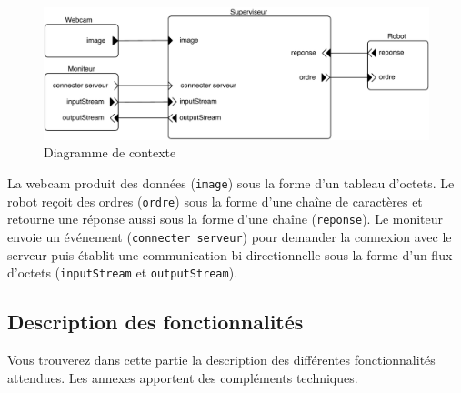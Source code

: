  \begin{figure}[htbp]
\begin{center}
\includegraphics[scale=0.6]{figures_pdf/contexte}
\caption{Diagramme de contexte}
\label{fig:contexte}
\end{center}
\end{figure}
\FloatBarrier

La webcam produit des données (\texttt{image}) sous la forme d'un tableau d'octets. Le robot reçoit des ordres (\texttt{ordre}) sous la forme d'une chaîne de caractères et retourne une réponse aussi sous la forme d'une chaîne (\texttt{reponse}). Le moniteur envoie un événement (\texttt{connecter serveur}) pour demander la connexion avec le serveur puis établit une communication bi-directionnelle sous la forme d'un flux d'octets (\texttt{inputStream} et \texttt{outputStream}).

%


\subsection{Description des fonctionnalités}

Vous trouverez dans cette partie la description des différentes fonctionnalités attendues. Les annexes apportent des compléments techniques.\\

\noindent{}

